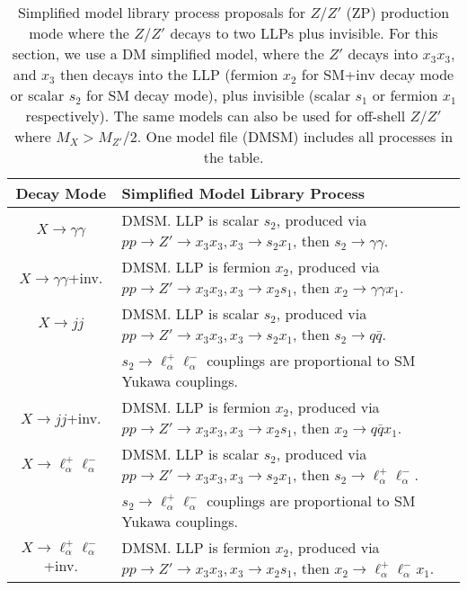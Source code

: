 %
\begin{table}
\begin{center}
\begin{tabular}{ |c|l|} 
 \hline
Decay Mode & Simplified Model Library Process \\
\hline\hline
$X\rightarrow \gamma\gamma$ & DMSM. LLP is scalar $s_2$, produced via $p p \rightarrow Z' \rightarrow x_3 x_3, x_3 \rightarrow s_2 x_1$, then $ s_2 \rightarrow \gamma \gamma$. \\
\hline
$X\rightarrow \gamma\gamma$+inv. &  DMSM. LLP is fermion $x_2$, produced via $p p \rightarrow Z' \rightarrow x_3 x_3, x_3 \rightarrow x_2 s_1$, then $ x_2 \rightarrow \gamma \gamma x_1$.    \\
\hline
$X\rightarrow jj$& DMSM. LLP is scalar $s_2$, produced via $p p \rightarrow Z' \rightarrow x_3 x_3, x_3 \rightarrow s_2 x_1$, then $s_2 \rightarrow q \bar q$.\\
& $s_2 \rightarrow \ell_\alpha^+\ell_\alpha^-$ couplings are proportional to SM Yukawa couplings.\\
\hline
$X\rightarrow jj$+inv.& DMSM. LLP is fermion $x_2$, produced via $p p \rightarrow Z' \rightarrow x_3 x_3, x_3 \rightarrow x_2 s_1$, then $x_2 \rightarrow q \bar q x_1$.\\
\hline
$X\rightarrow \ell_\alpha^+\ell_\alpha^-$ &  DMSM. LLP is scalar $s_2$, produced via $p p \rightarrow Z' \rightarrow x_3 x_3, x_3 \rightarrow s_2 x_1$, then $s_2 \rightarrow \ell_\alpha^+\ell_\alpha^-$.\\
& $s_2 \rightarrow \ell_\alpha^+\ell_\alpha^-$ couplings are proportional to SM Yukawa couplings.\\
\hline
$X\rightarrow \ell_\alpha^+\ell_\alpha^-$+inv. &   DMSM. LLP is fermion $x_2$, produced via $p p \rightarrow Z' \rightarrow x_3 x_3, x_3 \rightarrow x_2 s_1$, then $x_2 \rightarrow \ell_\alpha^+\ell_\alpha^- x_1$.\\

\hline
\end{tabular}
\end{center}
\caption{Simplified model library process proposals for $Z/Z'$ (ZP) production mode where the $Z/Z'$ decays to two LLPs plus invisible. For this section, we  use a DM simplified model, where the $Z'$ decays into $x_3 x_3$, and $x_3$ then decays into the LLP (fermion $x_2$ for SM+inv decay mode or scalar $s_2$ for SM decay mode), plus invisible (scalar $s_1$ or fermion $x_1$ respectively).  The same models can also be used for off-shell $Z/Z'$ where $M_X > M_{Z'}/2$. One model file (DMSM) includes all processes in the table.}\label{tab:Zp_inv_neutral_library}
\end{table}

